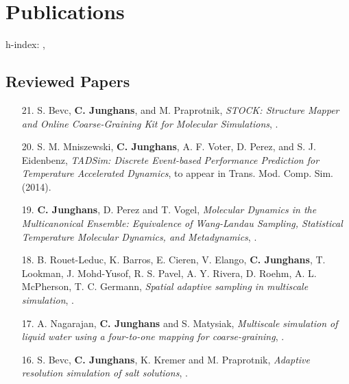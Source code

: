 \documentclass{article}
\begin{document}
\section*{Publications}

h-index: , 

\subsection*{Reviewed Papers}

\begin{enumerate}
\item[21.] S. Bevc, \textbf{C. Junghans}, and M. Praprotnik,
  \textit{STOCK: Structure Mapper and Online Coarse-Graining Kit for Molecular Simulations},
  .

\item[20.] S. M. Mniszewski, \textbf{C. Junghans}, A. F. Voter, D. Perez, and S. J. Eidenbenz,
  \textit{TADSim: Discrete Event-based Performance Prediction for Temperature Accelerated Dynamics},
  to appear in Trans.  Mod. Comp. Sim. (2014).

\item[19.] \textbf{C. Junghans}, D. Perez and T. Vogel,
  \textit{Molecular Dynamics in the Multicanonical Ensemble: Equivalence of Wang-Landau Sampling, Statistical Temperature Molecular Dynamics, and Metadynamics},
  .

\item[18.] B. Rouet-Leduc, K. Barros, E. Cieren, V. Elango, \textbf{C. Junghans}, T. Lookman, J. Mohd-Yusof, R. S. Pavel, A. Y. Rivera, D. Roehm, A. L. McPherson, T. C. Germann,
  \textit{Spatial adaptive sampling in multiscale simulation},
  .

\item[17.] A. Nagarajan, \textbf{C. Junghans} and S. Matysiak,
  \textit{Multiscale simulation of liquid water using a four-to-one mapping for coarse-graining},
  .

\item[16.] S. Bevc, \textbf{C. Junghans}, K. Kremer and M. Praprotnik,
  \textit{Adaptive resolution simulation of salt solutions},
  .


\end{enumerate}
\end{document}
